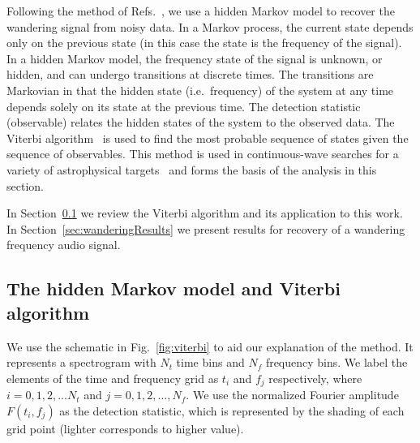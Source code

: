 \documentclass[paper-main.tex]{subfiles}
\begin{document}
Following the method of Refs.~\cite{SuvorovaEtAl:2016,SuvorovaEtAl:2017}, we use a hidden Markov model to recover the wandering signal from noisy data. 
In a Markov process, the current state depends only on the previous state (in this case the state is the frequency of the signal). 
In a hidden Markov model, the frequency state of the signal is unknown, or hidden, and can undergo transitions at discrete times. 
The transitions are Markovian in that the hidden state (i.e.\ frequency) of the system at any time depends solely on its state at the previous time. The detection statistic (observable) relates the hidden states of the system to the observed data.
The Viterbi algorithm~\cite{Viterbi:1967} is used to find the most probable sequence of states given the sequence of observables.
This method is used in continuous-wave searches for a variety of astrophysical targets~\cite{ScoX1O2Viterbi:2019, ScoX1ViterbiO1:2017, MillhouseStrangMelatos:2020, JonesSun:2020, MiddletonEtAlO2LMXBs:2020, PostMergerRemnantSearch:2019, SunEtAlSNR:2018, viterbi_application} and forms the basis of the analysis in this section. 

In Section~\ref{sec:viterbi} we review the Viterbi algorithm and its application to this work. 
In Section~\ref{sec:wanderingResults} we present results for recovery of a wandering frequency audio signal. 






\subsection{The hidden Markov model and Viterbi algorithm}
\label{sec:viterbi}


We use the schematic in Fig.~\ref{fig:viterbi} to aid our explanation of the method. 
It represents a spectrogram with $N_t$ time bins and $N_f$ frequency bins. 
We label the elements of the time and frequency  grid as $t_i$ and $f_j$ respectively, where $i=0,1,2,...N_t$ and $j=0,1,2,...,N_f$. 
We use the normalized Fourier amplitude $F(t_i,f_j)$ as the detection statistic, which is represented by the shading of each grid point (lighter corresponds to higher value). 
\end{document}
